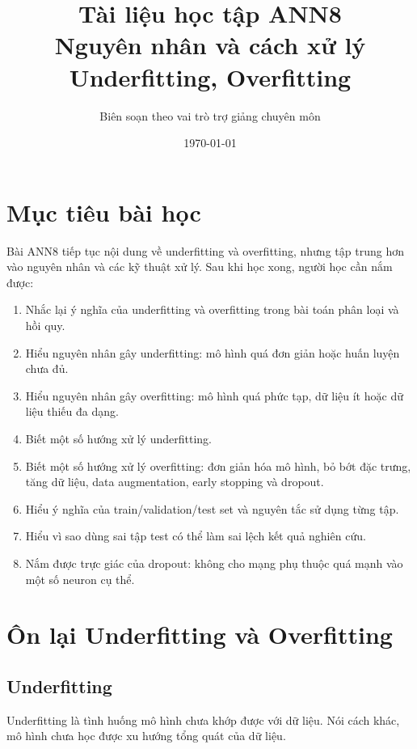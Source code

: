 \documentclass[12pt,a4paper]{report}
\title{
    \textbf{Tài liệu học tập ANN8}\\
    \large Nguyên nhân và cách xử lý Underfitting, Overfitting
}
\author{Biên soạn theo vai trò trợ giảng chuyên môn}
\date{\today}
\begin{document}
\maketitle
\tableofcontents
\newpage

\chapter*{Mục tiêu bài học}

Bài ANN8 tiếp tục nội dung về underfitting và overfitting, nhưng tập trung hơn vào nguyên nhân và các kỹ thuật xử lý. Sau khi học xong, người học cần nắm được:

\begin{enumerate}[label=\arabic*.]
    \item Nhắc lại ý nghĩa của underfitting và overfitting trong bài toán phân loại và hồi quy.
    \item Hiểu nguyên nhân gây underfitting: mô hình quá đơn giản hoặc huấn luyện chưa đủ.
    \item Hiểu nguyên nhân gây overfitting: mô hình quá phức tạp, dữ liệu ít hoặc dữ liệu thiếu đa dạng.
    \item Biết một số hướng xử lý underfitting.
    \item Biết một số hướng xử lý overfitting: đơn giản hóa mô hình, bỏ bớt đặc trưng, tăng dữ liệu, data augmentation, early stopping và dropout.
    \item Hiểu ý nghĩa của train/validation/test set và nguyên tắc sử dụng từng tập.
    \item Hiểu vì sao dùng sai tập test có thể làm sai lệch kết quả nghiên cứu.
    \item Nắm được trực giác của dropout: không cho mạng phụ thuộc quá mạnh vào một số neuron cụ thể.
\end{enumerate}

\chapter{Ôn lại Underfitting và Overfitting}

\section{Underfitting}

Underfitting là tình huống mô hình chưa khớp được với dữ liệu. Nói cách khác, mô hình chưa học được xu hướng tổng quát của dữ liệu.
\end{document}

